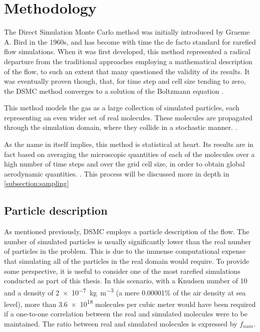 \section{Methodology}

The Direct Simulation Monte Carlo method  was initially introduced by Graeme A. Bird in the 1960s, and has become with time the de facto standard for rarefied flow simulations. When it was first developed, this method represented a radical departure from the traditional approaches employing a mathematical description of the flow, to such an extent that many questioned the validity of its results. It was eventually proven though, that, for time step and cell size tending to zero, the DSMC method converges to a solution of the Boltzmann equation \cite{bird}.

This method models the gas as a large collection of simulated particles, each representing an even wider set of real molecules. These molecules are propagated through the simulation domain, where they collide in a stochastic manner. \cite{themontecarlo}.

As the name in itself implies, this method is statistical at heart. Its results are in fact based on averaging the microscopic quantities of each of the molecules over a high number of time steps and over the grid cell size, in order to obtain global aerodynamic quantities. \cite{bird, themontecarlo}. This process will be discussed more in depth in \autoref{subsection:sampling}

\subsection{Particle description}
As mentioned previously, DSMC employs a particle description of the flow. The number of simulated particles is usually significantly lower than the real number of particles in the problem. This is due to the immense computational expense that simulating all of the particles in the real domain would require. \cite{natodsmc} To provide some perspective, it is useful to consider one of the most rarefied simulations conducted as part of this thesis. In this scenario, with a Knudsen number of 10 and a density of \SI{2e-7}{\kg\per\meter^3} (a mere 0.00001\% of the air density at sea level), more than \SI{3.6e18}{} molecules per cubic meter would have been required if a one-to-one correlation between the real and simulated molecules were to be maintained. The ratio between real and simulated molecules is expressed by $f_{num}$.

